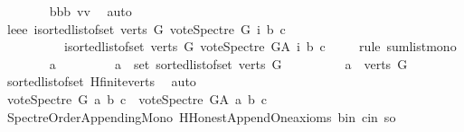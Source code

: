 \begin{isabellebody}
\ \ \ \ \ \ \isamarkupfalse%
\ bbb\ vv\ \isamarkupfalse%
\ auto\ \ \isanewline
\ \ \ \ \isamarkupfalse%
\ leee{\isacharcolon}{\kern0pt}\ {\isachardoublequoteopen}{\isacharparenleft}{\kern0pt}{\isasymSum}i{\isasymleftarrow}sorted{\isacharunderscore}{\kern0pt}list{\isacharunderscore}{\kern0pt}of{\isacharunderscore}{\kern0pt}set\ {\isacharparenleft}{\kern0pt}verts\ G{\isacharparenright}{\kern0pt}{\isachardot}{\kern0pt}\ vote{\isacharunderscore}{\kern0pt}Spectre\ G\ i\ b\ c{\isacharparenright}{\kern0pt}\ {\isasymle}\isanewline
\ \ \ \ \ \ \ \ \ \ {\isacharparenleft}{\kern0pt}{\isasymSum}i{\isasymleftarrow}sorted{\isacharunderscore}{\kern0pt}list{\isacharunderscore}{\kern0pt}of{\isacharunderscore}{\kern0pt}set\ {\isacharparenleft}{\kern0pt}verts\ G{\isacharparenright}{\kern0pt}{\isachardot}{\kern0pt}\ vote{\isacharunderscore}{\kern0pt}Spectre\ G{\isacharunderscore}{\kern0pt}A\ i\ b\ c{\isacharparenright}{\kern0pt}{\isachardoublequoteclose}\isanewline
\ \ \ \ \isamarkupfalse%
{\isacharparenleft}{\kern0pt}rule\ sum{\isacharunderscore}{\kern0pt}list{\isacharunderscore}{\kern0pt}mono{\isacharparenright}{\kern0pt}\isanewline
\ \ \ \ \ \ \isamarkupfalse%
\ a\ \isanewline
\ \ \ \ \ \ \isamarkupfalse%
\ {\isachardoublequoteopen}a\ {\isasymin}\ set\ {\isacharparenleft}{\kern0pt}sorted{\isacharunderscore}{\kern0pt}list{\isacharunderscore}{\kern0pt}of{\isacharunderscore}{\kern0pt}set\ {\isacharparenleft}{\kern0pt}verts\ G{\isacharparenright}{\kern0pt}{\isacharparenright}{\kern0pt}{\isachardoublequoteclose}\isanewline
\ \ \ \ \ \ \isamarkupfalse%
\ \isamarkupfalse%
\ {\isachardoublequoteopen}a\ {\isasymin}\ verts\ G{\isachardoublequoteclose}\ \isamarkupfalse%
\ sorted{\isacharunderscore}{\kern0pt}list{\isacharunderscore}{\kern0pt}of{\isacharunderscore}{\kern0pt}set{\isacharparenleft}{\kern0pt}{}{\isacharparenright}{\kern0pt}\ H{}{\isachardot}{\kern0pt}finite{\isacharunderscore}{\kern0pt}verts\ \isamarkupfalse%
\ auto\isanewline
\ \ \ \ \ \ \isamarkupfalse%
\ \isamarkupfalse%
\ {\isachardoublequoteopen}vote{\isacharunderscore}{\kern0pt}Spectre\ G\ a\ b\ c\ {\isasymle}\ vote{\isacharunderscore}{\kern0pt}Spectre\ G{\isacharunderscore}{\kern0pt}A\ a\ b\ c{\isachardoublequoteclose}\isanewline
\ \ \ \ \ \ \ \ \isamarkupfalse%
\ Spectre{\isacharunderscore}{\kern0pt}Order{\isacharunderscore}{\kern0pt}Appending{\isacharunderscore}{\kern0pt}Mono\ H{}{\isachardot}{\kern0pt}Honest{\isacharunderscore}{\kern0pt}Append{\isacharunderscore}{\kern0pt}One{\isacharunderscore}{\kern0pt}axioms\ b{\isacharunderscore}{\kern0pt}in\ c{\isacharunderscore}{\kern0pt}in\ so\ \isamarkupfalse%

\end{isabellebody}
